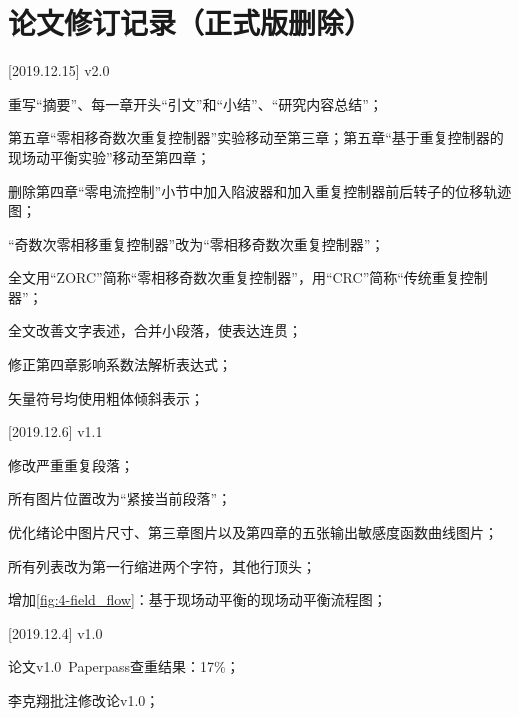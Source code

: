 \documentclass[
  lang=cn,
  degree=master,
  openany,oneside
]{nuaathesis}
\begin{document}



\chapter{论文修订记录（正式版删除）}


[2019.12.15] v2.0

重写“摘要”、每一章开头“引文”和“小结”、“研究内容总结”；

第五章“零相移奇数次重复控制器”实验移动至第三章；第五章“基于重复控制器的现场动平衡实验”移动至第四章；

删除第四章“零电流控制”小节中加入陷波器和加入重复控制器前后转子的位移轨迹图；

“奇数次零相移重复控制器”改为“零相移奇数次重复控制器”；

全文用“ZORC”简称“零相移奇数次重复控制器”，用“CRC”简称“传统重复控制器”；

全文改善文字表述，合并小段落，使表达连贯；

修正第四章影响系数法解析表达式；

矢量符号均使用粗体倾斜表示；


[2019.12.6] v1.1 

修改严重重复段落；

所有图片位置改为“紧接当前段落”；

优化绪论中图片尺寸、第三章图片以及第四章的五张输出敏感度函数曲线图片；

所有列表改为第一行缩进两个字符，其他行顶头；

增加\autoref{fig:4-field_flow}：基于现场动平衡的现场动平衡流程图；


[2019.12.4] v1.0 

论文v1.0~Paperpass查重结果：17\%； 

李克翔批注修改论v1.0；
\end{document}
